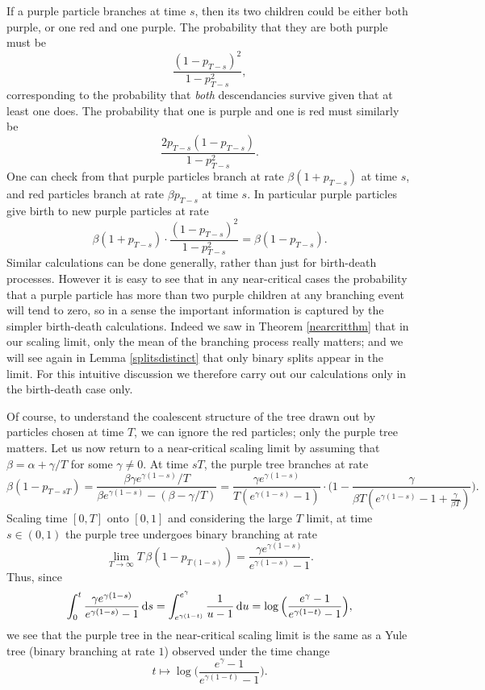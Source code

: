 \documentclass{article}
\theoremstyle{plain}
\theoremstyle{definition}
\renewcommand{\d}{{\rm{d}}}
\begin{document}
If a purple particle branches at time $s$, then its two children could be either both purple, or one red and one purple. The probability that they are both purple must be 
\[\frac{(1-p_{T-s})^2}{1-p_{T-s}^2},\]
corresponding to the probability that \emph{both} descendancies survive given that at least one does. The probability that one is purple and one is red must similarly be
\[\frac{2p_{T-s}(1-p_{T-s})}{1-p_{T-s}^2}.\]
One can check from \cite{harris_hesse_kyprianou:bbm_strip} that purple particles branch at rate $\beta(1+p_{T-s})$ at time $s$, and red particles branch at rate $\beta p_{T-s}$ at time $s$. In particular purple particles give birth to new purple particles at rate
\[\beta(1+p_{T-s})\cdot \frac{(1-p_{T-s})^2}{1-p_{T-s}^2} = \beta(1-p_{T-s}).\]
Similar calculations can be done generally, rather than just for birth-death processes. However it is easy to see that in any near-critical cases the probability that a purple particle has more than two purple children at any branching event will tend to zero, so in a sense the important information is captured by the simpler birth-death calculations. Indeed we saw in Theorem \ref{nearcritthm} that in our scaling limit, only the mean of the branching process really matters; and we will see again in Lemma \ref{splitsdistinct} that only binary splits appear in the limit. For this intuitive discussion we therefore carry out our calculations only in the birth-death case only. 

Of course, to understand the coalescent structure of the tree drawn out by particles chosen at time $T$, we can ignore the red particles; only the purple tree matters. Let us now return to a near-critical scaling limit by assuming that $\beta = \alpha + \gamma/T$ for some $\gamma\neq 0$. At time $sT$, the purple tree branches at rate
\[\beta(1-p_{T-sT}) = \frac{\beta\gamma e^{\gamma (1-s)}/T}{\beta e^{\gamma(1-s)} - (\beta - \gamma/T)} = \frac{\gamma e^{\gamma(1-s)}}{T(e^{\gamma(1-s)}-1)} \cdot \Big(1-\frac{\gamma}{\beta T(e^{\gamma(1-s)}-1+\frac{\gamma}{\beta T})}\Big).\]
Scaling time $[0,T]$ onto $[0,1]$ and considering the large $T$ limit, at time $s\in(0,1)$ the purple tree undergoes binary branching at rate
\begin{equation}
\lim_{T\rightarrow\infty} T\,\beta(1-p_{T(1-s)})=\frac{\gamma e^{\gamma(1-s)}}{e^{\gamma(1-s)}-1}.
\label{purplerate}
\end{equation}
Thus, since
\[\int_0^t \frac{\gamma e^{\gamma(1-s)}}{e^{\gamma(1-s)}-1}\, \d s = \int_{e^{\gamma(1-t)}}^{e^{\gamma}} \frac{1}{u-1}\,\d u = \log\Big(\frac{e^\gamma-1}{e^{\gamma(1-t)}-1}\Big),\]
we see that the purple tree in the near-critical scaling limit is the same as a Yule tree (binary branching at rate $1$) observed under the time change
\[t \mapsto \log\Big(\frac{e^\gamma-1}{e^{\gamma(1-t)}-1}\Big).\]
\end{document}
